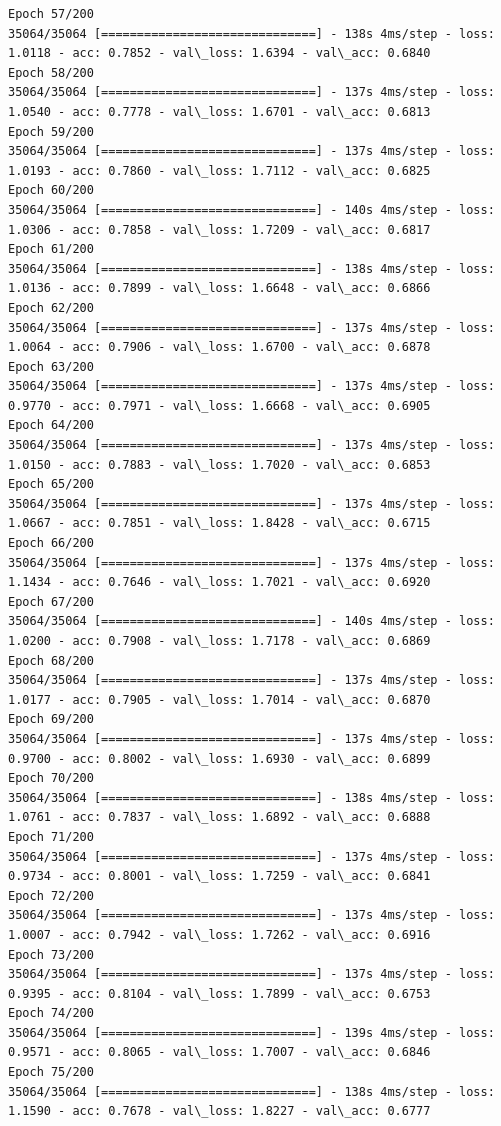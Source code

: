 \documentclass[11pt]{article}
\begin{document}
\begin{Verbatim}[commandchars=\\\{\}]
Epoch 57/200
35064/35064 [==============================] - 138s 4ms/step - loss: 1.0118 - acc: 0.7852 - val\_loss: 1.6394 - val\_acc: 0.6840
Epoch 58/200
35064/35064 [==============================] - 137s 4ms/step - loss: 1.0540 - acc: 0.7778 - val\_loss: 1.6701 - val\_acc: 0.6813
Epoch 59/200
35064/35064 [==============================] - 137s 4ms/step - loss: 1.0193 - acc: 0.7860 - val\_loss: 1.7112 - val\_acc: 0.6825
Epoch 60/200
35064/35064 [==============================] - 140s 4ms/step - loss: 1.0306 - acc: 0.7858 - val\_loss: 1.7209 - val\_acc: 0.6817
Epoch 61/200
35064/35064 [==============================] - 138s 4ms/step - loss: 1.0136 - acc: 0.7899 - val\_loss: 1.6648 - val\_acc: 0.6866
Epoch 62/200
35064/35064 [==============================] - 137s 4ms/step - loss: 1.0064 - acc: 0.7906 - val\_loss: 1.6700 - val\_acc: 0.6878
Epoch 63/200
35064/35064 [==============================] - 137s 4ms/step - loss: 0.9770 - acc: 0.7971 - val\_loss: 1.6668 - val\_acc: 0.6905
Epoch 64/200
35064/35064 [==============================] - 137s 4ms/step - loss: 1.0150 - acc: 0.7883 - val\_loss: 1.7020 - val\_acc: 0.6853
Epoch 65/200
35064/35064 [==============================] - 137s 4ms/step - loss: 1.0667 - acc: 0.7851 - val\_loss: 1.8428 - val\_acc: 0.6715
Epoch 66/200
35064/35064 [==============================] - 137s 4ms/step - loss: 1.1434 - acc: 0.7646 - val\_loss: 1.7021 - val\_acc: 0.6920
Epoch 67/200
35064/35064 [==============================] - 140s 4ms/step - loss: 1.0200 - acc: 0.7908 - val\_loss: 1.7178 - val\_acc: 0.6869
Epoch 68/200
35064/35064 [==============================] - 137s 4ms/step - loss: 1.0177 - acc: 0.7905 - val\_loss: 1.7014 - val\_acc: 0.6870
Epoch 69/200
35064/35064 [==============================] - 137s 4ms/step - loss: 0.9700 - acc: 0.8002 - val\_loss: 1.6930 - val\_acc: 0.6899
Epoch 70/200
35064/35064 [==============================] - 138s 4ms/step - loss: 1.0761 - acc: 0.7837 - val\_loss: 1.6892 - val\_acc: 0.6888
Epoch 71/200
35064/35064 [==============================] - 137s 4ms/step - loss: 0.9734 - acc: 0.8001 - val\_loss: 1.7259 - val\_acc: 0.6841
Epoch 72/200
35064/35064 [==============================] - 137s 4ms/step - loss: 1.0007 - acc: 0.7942 - val\_loss: 1.7262 - val\_acc: 0.6916
Epoch 73/200
35064/35064 [==============================] - 137s 4ms/step - loss: 0.9395 - acc: 0.8104 - val\_loss: 1.7899 - val\_acc: 0.6753
Epoch 74/200
35064/35064 [==============================] - 139s 4ms/step - loss: 0.9571 - acc: 0.8065 - val\_loss: 1.7007 - val\_acc: 0.6846
Epoch 75/200
35064/35064 [==============================] - 138s 4ms/step - loss: 1.1590 - acc: 0.7678 - val\_loss: 1.8227 - val\_acc: 0.6777

\end{Verbatim}
\end{document}
